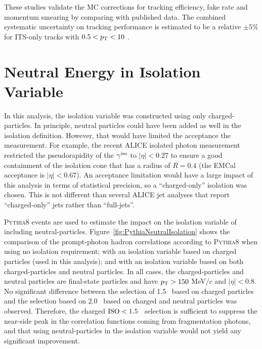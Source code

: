 These studies validate the MC corrections for tracking efficiency, fake rate and momentum smearing by comparing with published data. The combined systematic uncertainty on tracking performance is estimated to be a relative $\pm 5\%$ for ITS-only tracks with $0.5 < p_{\mathrm{T}} < 10$ \GeVc. 

\FloatBarrier
\section{Neutral Energy in Isolation Variable}

In this analysis, the isolation variable was constructed using only charged-particles. In principle, neutral particles could have been added as well in the isolation definition. However, that would have limited the acceptance the measurement. For example, the recent ALICE isolated photon measurement~\cite{Acharya:2019jkx} restricted the pseudorapidity of the $\gamma^\mathrm{iso}$ to $|\eta|<0.27$ to ensure a good containment of the isolation cone that has a radius of $R=0.4$ (the EMCal acceptance is $|\eta|<0.67$). An acceptance limitation would have a large impact of this analysis in terms of statistical precision, so a ``charged-only'' isolation was chosen. This is not different than several ALICE jet analyses that report ``charged-only'' jets rather than ``full-jets''. 

\textsc{Pythia8} events are used to estimate the impact on the isolation variable of including neutral-particles. Figure~\ref{fig:PythiaNeutralIsolation} shows the comparison of the prompt-photon hadron correlations according to \textsc{Pythia8} when using no isolation requirement; with an isolation variable based on charged particles (used in this analysis); and with an isolation variable based on both charged-particles and neutral particles. In all cases, the charged-particles and neutral particles are final-state particles and have $p_{\mathrm{T}}>150$ MeV/$c$ and $|\eta|<0.8$. No significant difference between the selection of 1.5 \GeVc~based on charged particles and the selection based on 2.0 \GeVc~based on charged and neutral particles was observed. Therefore, the charged $\mathrm{ISO}<1.5$ \GeVc~selection is sufficient to suppress the near-side peak in the correlation functions coming from fragmentation photons, and that using neutral-particles in the isolation variable would not yield any significant improvement.

